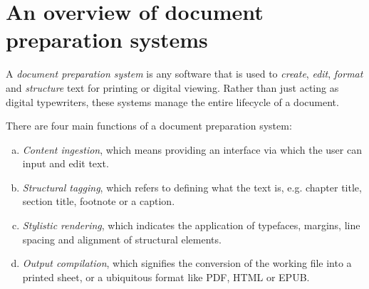 \section{An overview of document preparation systems}
	A \emph{document preparation system} is any software that is used to \emph{create}, \emph{edit}, \emph{format} and \emph{structure} text for printing or digital viewing. Rather than just acting as digital typewriters, these systems manage the entire lifecycle of a document.
	
	There are four main functions of a document preparation system:
	\begin{enumerate}[a)]
		\item \emph{Content ingestion}, which means providing an interface via which the user can input and edit text.
		\item \emph{Structural tagging}, which refers to defining what the text is, e.g. chapter title, section title, footnote or a caption.
		\item \emph{Stylistic rendering}, which indicates the application of typefaces, margins, line spacing and alignment of structural elements.
		\item \emph{Output compilation}, which signifies the conversion of the working file into a printed sheet, or a ubiquitous format like PDF, HTML or EPUB.
	\end{enumerate}
	
